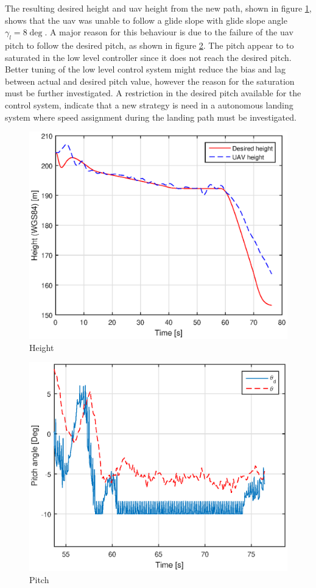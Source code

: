 The resulting desired height and \gls{uav} height from the new path, shown in figure \ref{Fig:Height1juni081328}, shows that the \gls{uav} was unable to follow a glide slope with glide slope angle $\gamma_l = 8 \deg$. A major reason for this behaviour is due to the failure of the \gls{uav} pitch to follow the desired pitch, as shown in figure \ref{Fig:Pitch1juni081328}. The pitch appear to to saturated in the low level controller since it does not reach the desired pitch. Better tuning of the low level control system might reduce the bias and lag between actual and desired pitch value, however the reason for the saturation must be further investigated. A restriction in the desired pitch available for the control system, indicate that a new strategy is need in a autonomous landing system where speed assignment during the landing path must be investigated.
\begin{figure}[H]
\centering
\includegraphics[scale=0.7]{figs/Experiment/Height1juni081328.eps}
\caption{Height}
\label{Fig:Height1juni081328}
\end{figure}
\begin{figure}[H]
\centering
\includegraphics[scale=0.7]{figs/Experiment/Pitch1juni081328.eps}
\caption{Pitch}
\label{Fig:Pitch1juni081328}
\end{figure}
